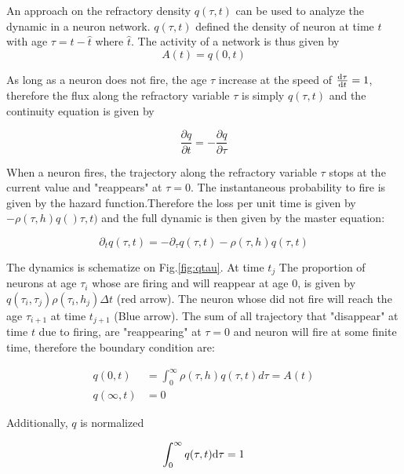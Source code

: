 \documentclass[12pt,twoside]{report}
\def \dd  {{\rm d}}
\begin{document}
An approach on the refractory density $q(\tau,t) $ can be used to analyze the dynamic in a neuron network. $q(\tau,t)$ defined the density of neuron at time $t$ with age $\tau=t-\hat{t}$ where $\hat{t}$. The activity of a network is thus given by
\begin{equation}
\label{eq:A}
A(t)=q(0,t)
\end{equation}

As long as a neuron does not fire, the age $\tau$ increase at the speed of $\frac{\dd \tau}{\dd t}=1$, therefore the flux along the refractory variable $\tau$ is simply $q(\tau,t)$ and the continuity equation  is given by

\begin{equation}
\label{eq:continuity1}
\frac{\partial q}{\partial t}=-\frac{\partial q}{\partial \tau}
\end{equation}

When a neuron fires, the trajectory along the refractory variable $\tau$ stops at the current value and "reappears" at $\tau=0$. The instantaneous probability to fire is given by the hazard function.Therefore the loss per unit time is given by $-\rho(\tau,h)q()\tau,t)$ and the full dynamic is then given by the master equation:

\begin{equation}
\label{eq:masterequation}
\partial_t q(\tau,t)=-\partial_\tau q(\tau,t)-\rho(\tau,h)q(\tau,t)
\end{equation}

The dynamics is schematize on Fig.\ref{fig:qtau}. At time $t_j$ The proportion of neurons at age $\tau_i$ whose are firing and will reappear at age $0$, is given by$q(\tau_i,\tau_j)\rho(\tau_i,h_j)\Delta t$ (red arrow). The neuron whose did not fire will reach the age $\tau_{i+1}$ at time $t_{j+1}$ (Blue arrow). The sum of all trajectory that "disappear" at time $t$ due to firing, are "reappearing" at $\tau=0$ and  neuron will fire at some finite time, therefore the boundary condition are:

\begin{align}
\label{eq:boundarycondition}
q(0,t)&=\int_{0}^{\infty}\rho(\tau,h)q(\tau,t)d\tau=A(t) \\
q(\infty,t)&=0
\end{align}

Additionally, $q$ is normalized

\begin{equation}
\label{eq:qnormalisation}
\int_0^\infty q(\tau,t)\dd \tau = 1
\end{equation}
\end{document}
